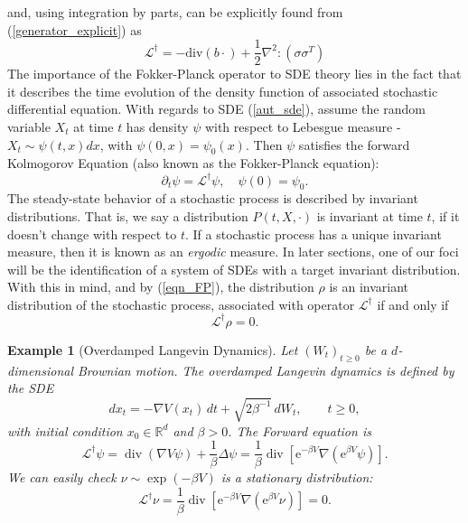 \documentclass[11pt, twoside]{report}
\newtheorem{example}[theorem]{Example}
\begin{document}
and, using integration by parts, can be explicitly found from (\ref{generator_explicit}) as
\begin{equation} \label{gen_dag_explicit}
    \mathcal{L}^{\dagger} = -\mathrm{div}(b\cdot) + \frac{1}{2} \nabla^2:(\sigma \sigma^T)
\end{equation}
The importance of the Fokker-Planck operator to SDE theory lies in the fact that it describes the time evolution of the density function of associated stochastic differential equation. With regards to SDE (\ref{aut_sde}), assume the random variable $X_t$ at time $t$ has density $\psi$ with respect to Lebesgue measure - $X_t \sim \psi(t,x) dx$, with $\psi(0,x) = \psi_0(x).$ Then $\psi$ satisfies the forward Kolmogorov Equation (also known as the Fokker-Planck equation):
\begin{equation} \label{eqn_FP}
    \partial_t \psi = \mathcal{L}^\dagger \psi, \quad \psi(0) = \psi_0.
\end{equation}
The steady-state behavior of a stochastic process is described by invariant distributions. That is, we say a distribution $P(t,X,\cdot)$ is invariant at time $t$, if it doesn't change with respect to $t$. If a stochastic process has a unique invariant measure, then it is known as an \textit{ergodic} measure. In later sections, one of our foci will be the identification of a system of SDEs with a target invariant distribution. With this in mind, and by (\ref{eqn_FP}), the distribution $\rho$ is an invariant distribution of the stochastic process, associated with operator $\mathcal{L}^{\dagger}$ if and only if
\begin{equation}\label{eqn_FP_inv}
    \mathcal{L}^{\dagger} \rho = 0.
\end{equation}


\begin{example}[Overdamped Langevin Dynamics]
Let $(W_t)_{t\ge0}$ be a $d$-dimensional Brownian motion.
The overdamped Langevin dynamics is defined by the SDE
\[
dx_t = -\nabla V(x_t)\,dt + \sqrt{2\beta^{-1}}\, dW_t, \qquad t \ge 0,
\]
with initial condition $x_0 \in \mathbb{R}^d$ and $\beta > 0$. The Forward equation is
    $$
\mathcal{L}^{\dagger} \psi=\operatorname{div}(\nabla V \psi)+\frac{1}{\beta} \Delta \psi=\frac{1}{\beta} \operatorname{div}\left[\mathrm{e}^{-\beta V} \nabla\left(\mathrm{e}^{\beta V} \psi\right)\right] .
$$
    We can easily check $\nu \sim \exp{(-\beta V)}$ is a stationary distribution:
    \[\mathcal{L}^{\dagger} \nu = \frac{1}{\beta} \operatorname{div}\left[\mathrm{e}^{-\beta V} \nabla\left(\mathrm{e}^{\beta V} \nu\right)\right] = 0.\]
\end{example}
\end{document}
